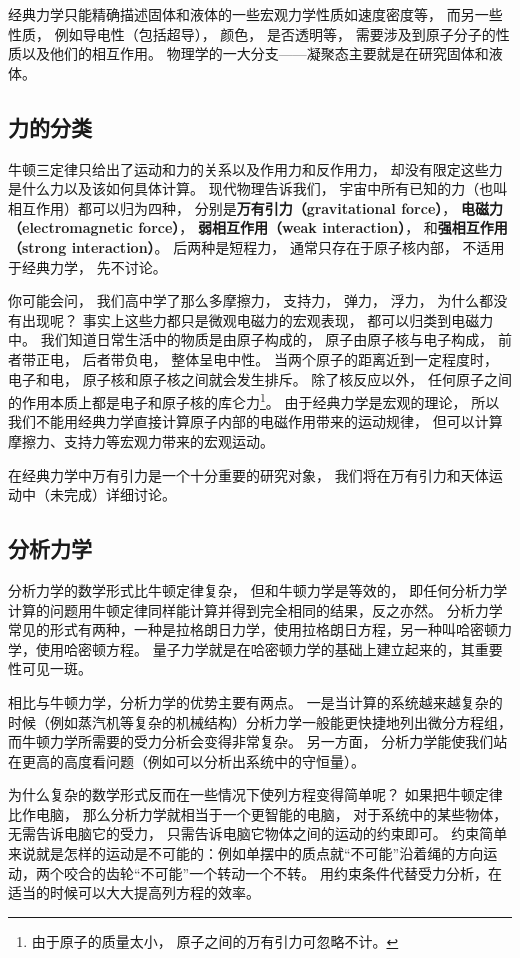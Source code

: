 经典力学只能精确描述固体和液体的一些宏观力学性质如速度密度等， 而另一些性质， 例如导电性（包括超导）， 颜色， 是否透明等， 需要涉及到原子分子的性质以及他们的相互作用。 物理学的一大分支——凝聚态主要就是在研究固体和液体。

\subsection{力的分类}
牛顿三定律只给出了运动和力的关系以及作用力和反作用力， 却没有限定这些力是什么力以及该如何具体计算。 现代物理告诉我们， 宇宙中所有已知的力（也叫相互作用）都可以归为四种， 分别是\textbf{万有引力（gravitational force）}， \textbf{电磁力（electromagnetic force）}， \textbf{弱相互作用（weak interaction）}， 和\textbf{强相互作用（strong interaction）}。 后两种是短程力， 通常只存在于原子核内部， 不适用于经典力学， 先不讨论。

你可能会问， 我们高中学了那么多摩擦力， 支持力， 弹力， 浮力， 为什么都没有出现呢？ 事实上这些力都只是微观电磁力的宏观表现， 都可以归类到电磁力中。 我们知道日常生活中的物质是由原子构成的， 原子由原子核与电子构成， 前者带正电， 后者带负电， 整体呈电中性。 当两个原子的距离近到一定程度时， 电子和电， 原子核和原子核之间就会发生排斥。 除了核反应以外， 任何原子之间的作用本质上都是电子和原子核的库仑力\footnote{由于原子的质量太小， 原子之间的万有引力可忽略不计。}。 由于经典力学是宏观的理论， 所以我们不能用经典力学直接计算原子内部的电磁作用带来的运动规律， 但可以计算摩擦力、支持力等宏观力带来的宏观运动。

在经典力学中万有引力是一个十分重要的研究对象， 我们将在万有引力和天体运动中（未完成）详细讨论。

\subsection{分析力学}
分析力学的数学形式比牛顿定律复杂， 但和牛顿力学是等效的， 即任何分析力学计算的问题用牛顿定律同样能计算并得到完全相同的结果，反之亦然。 分析力学常见的形式有两种，一种是拉格朗日力学，使用拉格朗日方程，另一种叫哈密顿力学，使用哈密顿方程。 量子力学就是在哈密顿力学的基础上建立起来的，其重要性可见一斑。%

相比与牛顿力学，分析力学的优势主要有两点。 一是当计算的系统越来越复杂的时候（例如蒸汽机等复杂的机械结构）分析力学一般能更快捷地列出微分方程组， 而牛顿力学所需要的受力分析会变得非常复杂。 另一方面， 分析力学能使我们站在更高的高度看问题（例如可以分析出系统中的守恒量）。

为什么复杂的数学形式反而在一些情况下使列方程变得简单呢？ 如果把牛顿定律比作电脑， 那么分析力学就相当于一个更智能的电脑， 对于系统中的某些物体， 无需告诉电脑它的受力， 只需告诉电脑它物体之间的运动的约束即可。 约束简单来说就是怎样的运动是不可能的：例如单摆中的质点就“不可能”沿着绳的方向运动，两个咬合的齿轮“不可能”一个转动一个不转。 用约束条件代替受力分析，在适当的时候可以大大提高列方程的效率。

